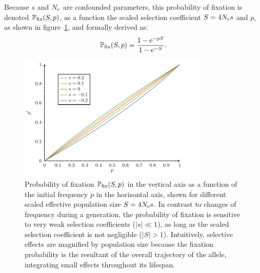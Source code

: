 Because $s$ and $N_{\text{e}}$ are confounded parameters, this probability of fixation is denoted $\mathbb{P}_{\text{fix}}(S, p)$, as a function the scaled selection coefficient $S = 4 N_{\text{e}} s$ and $p$, as shown in figure~\ref{fig:pfix-p}, and formally derived as:
\begin{equation}
    \mathbb{P}_{\text{fix}}(S, p) = \dfrac{1 - \text{e}^{- p S }}{1 - \text{e}^{-S}}.
\end{equation}


\begin{figure}[H]
    \centering
    \includegraphics[width=0.8\textwidth, page=3] {figures.pdf}
    \caption[Probability of fixation]{
    Probability of fixation $\mathbb{P}_{\text{fix}}(S, p)$ in the vertical axis as a function of the initial frequency $p$ in the horizontal axis, shown for different scaled effective population size $S=4 N_{\text{e}} s$.
    In contrast to changes of frequency during a generation, the probability of fixation is sensitive to very weak selection coefficients ($|s| \ll 1$), as long as the scaled selection coefficient is not negligible ($|S| > 1$).
    Intuitively, selective effects are magnified by population size because the fixation probability is the resultant of the overall trajectory of the allele, integrating small effects throughout its lifespan. }
    \label{fig:pfix-p}
\end{figure}

